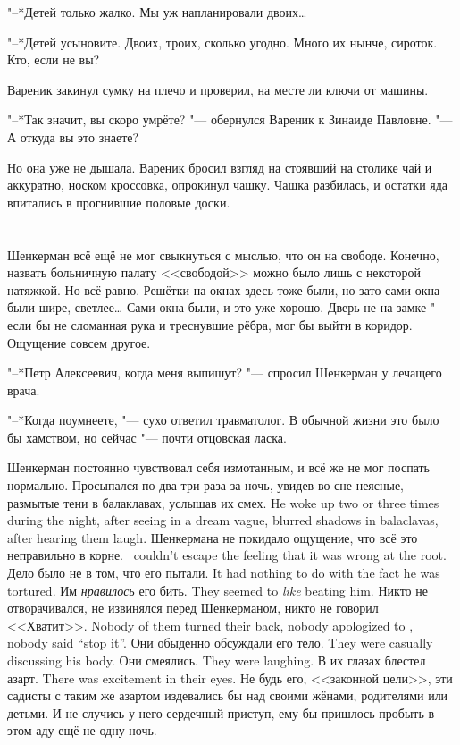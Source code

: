 "--*Детей только жалко.
Мы уж напланировали двоих\ldots{}

"--*Детей усыновите.
Двоих, троих, сколько угодно.
Много их нынче, сироток.
Кто, если не вы?

Вареник закинул сумку на плечо и проверил, на месте ли ключи от машины.

"--*Так значит, вы скоро умрёте? "--- обернулся Вареник к Зинаиде Павловне.
"--- А откуда вы это знаете?

Но она уже не дышала.
Вареник бросил взгляд на стоявший на столике чай и аккуратно, носком кроссовка, опрокинул чашку.
Чашка разбилась, и остатки яда впитались в прогнившие половые доски.

\chapter{}

Шенкерман всё ещё не мог свыкнуться с мыслью, что он на свободе.
Конечно, назвать больничную палату <<свободой>> можно было лишь с некоторой натяжкой.
Но всё равно.
Решётки на окнах здесь тоже были, но зато сами окна были шире, светлее\ldots{}
Сами окна были, и это уже хорошо.
Дверь не на замке "--- если бы не сломанная рука и треснувшие рёбра, мог бы выйти в коридор.
Ощущение совсем другое.

"--*Петр Алексеевич, когда меня выпишут? "--- спросил Шенкерман у лечащего врача.

"--*Когда поумнеете, "--- сухо ответил травматолог.
В обычной жизни это было бы хамством, но сейчас "--- почти отцовская ласка.

Шенкерман постоянно чувствовал себя измотанным, и всё же не мог поспать нормально.
{Просыпался по два-три раза за ночь, увидев во сне неясные, размытые тени в балаклавах, услышав их смех.}
{He woke up two or three times during the night, after seeing in a dream vague, blurred shadows in balaclavas, after hearing them laugh.}
{Шенкермана не покидало ощущение, что всё это неправильно в корне.}
{\Shenkerman\ couldn't escape the feeling that it was wrong at the root.}
{Дело было не в том, что его пытали.}
{It had nothing to do with the fact he was tortured.}
{Им \emph{нравилось} его бить.}
{They seemed to \emph{like} beating him.}
{Никто не отворачивался, не извинялся перед Шенкерманом, никто не говорил <<Хватит>>.}
{Nobody of them turned their back, nobody apologized to \Shenkerman, nobody said ``stop it''.}
{Они обыденно обсуждали его тело.}
{They were casually discussing his body.}
{Они смеялись.}
{They were laughing.}
{В их глазах блестел азарт.}
{There was excitement in their eyes.}
Не будь его, <<законной цели>>, эти садисты с таким же азартом издевались бы над своими жёнами, родителями или детьми.
И не случись у него сердечный приступ, ему бы пришлось пробыть в этом аду ещё не одну ночь.


